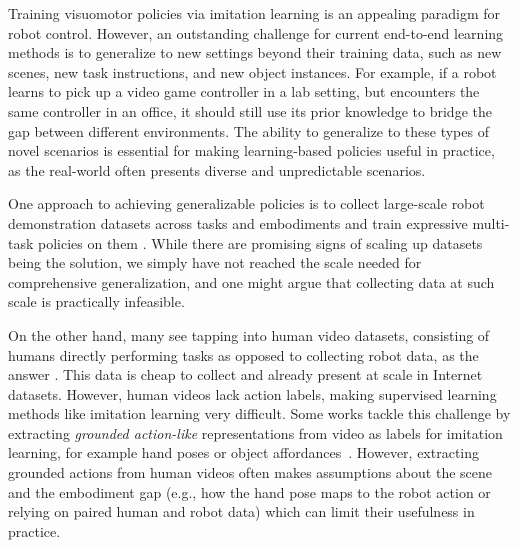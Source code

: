Training visuomotor policies via imitation learning is an appealing paradigm for robot control. However, an outstanding challenge for current end-to-end learning methods is to generalize to new settings beyond their training data, such as new scenes, new task instructions, and new object instances. For example, if a robot learns to pick up a video game controller in a lab setting, but encounters the same controller in an office, it should still use its prior knowledge to bridge the gap between different environments. 
The ability to generalize to these types of novel scenarios is essential for making learning-based policies useful in practice, as the real-world often presents diverse and unpredictable scenarios. 

One approach to achieving generalizable policies is to collect large-scale robot demonstration datasets across tasks and embodiments and train expressive multi-task policies on them \cite{khazatsky2024droid, oxe2024, kim2024openvla, team2024octo}. While there are promising signs of scaling up datasets being the solution, we simply have not reached the scale needed for comprehensive generalization, and one might argue that collecting data at such scale is practically infeasible.

On the other hand, many see tapping into human video datasets, consisting of humans directly performing tasks as opposed to collecting robot data, as the answer \cite{ye2024latent, wang2023mimicplay, bharadhwaj2024gen2act}. This data is cheap to collect and already present at scale in Internet datasets. However, human videos lack action labels, making supervised learning methods like imitation learning very difficult. Some works tackle this challenge by extracting \emph{grounded action-like} representations from video as labels for imitation learning, for example hand poses or object affordances~\cite{bharadhwaj2024track2act, ren2025motion, lepertshadow, xu2023xskill}. However, extracting grounded actions from human videos often makes assumptions about the scene and the embodiment gap (e.g., how the hand pose maps to the robot action or relying on paired human and robot data) which can limit their usefulness in practice. 

